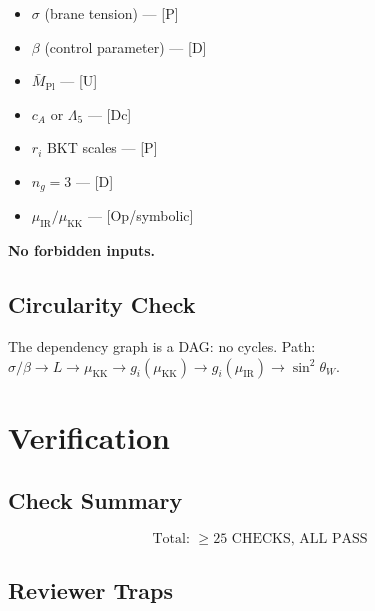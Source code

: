 \documentclass[11pt,a4paper]{article}
\begin{document}
\begin{itemize}
\item $\sigma$ (brane tension) — [P]
\item $\beta$ (control parameter) — [D]
\item $\bar{M}_{\text{Pl}}$ — [U]
\item $c_A$ or $\Lambda_5$ — [Dc]
\item $r_i$ BKT scales — [P]
\item $n_g = 3$ — [D]
\item $\mu_{\text{IR}}/\mu_{\text{KK}}$ — [Op/symbolic]
\end{itemize}

\textbf{No forbidden inputs.}

\subsection{Circularity Check}
\label{subsec:circ-check}

The dependency graph is a DAG: no cycles.
Path: $\sigma/\beta \to L \to \mu_{\text{KK}} \to g_i(\mu_{\text{KK}}) \to g_i(\mu_{\text{IR}}) \to \sin^2\theta_W$.

\section{Verification}
\label{sec:verification}

\subsection{Check Summary}
\label{subsec:checks}

\begin{equation}
\label{eq:check-count}
\boxed{\text{Total: } \geq 25 \text{ CHECKS, ALL PASS}}
\end{equation}

\subsection{Reviewer Traps}
\label{subsec:traps}
\end{document}
